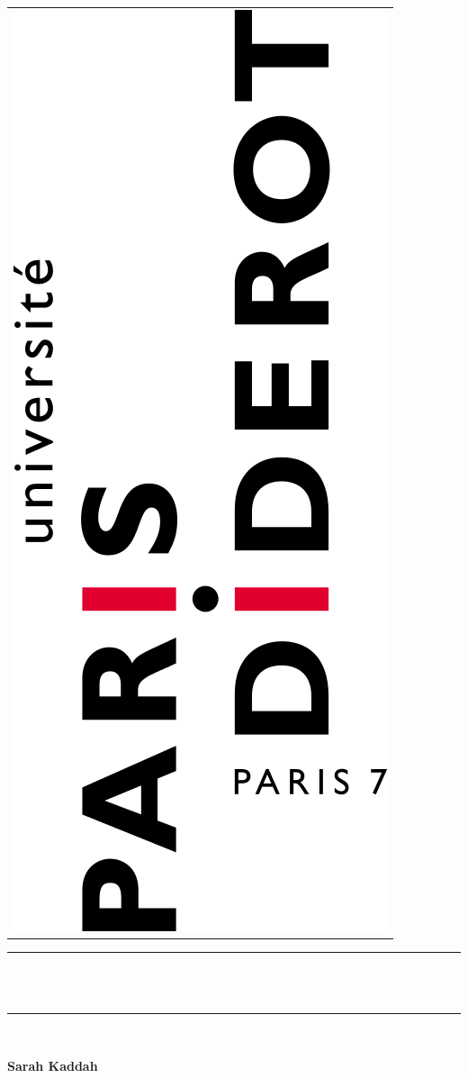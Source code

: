 \documentclass[12pt,a4paper]{article}
\newcommand{\HRule}{\rule{\linewidth}{0.5mm}}
\begin{document}
\begin{titlepage}
\begin{sffamily}
\begin{center}
\begin{tabular}{c}
\includegraphics[scale=0.1]{img/p7.png}
\end{tabular}

    \HRule \\[0.2cm]
    { \huge \bfseries {}\\[0.4cm] }
    \HRule \\%
\begin{center}\LARGE{\textbf{Sarah Kaddah}}\end{center}%


\end{center}
\end{sffamily}
\end{titlepage}
\end{document}
